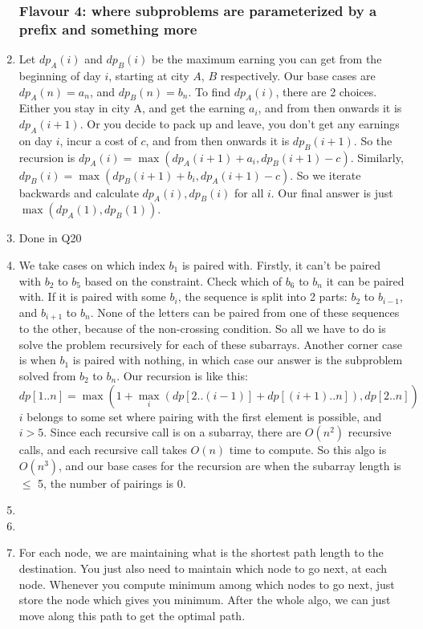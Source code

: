 \documentclass[12pt]{report}
\begin{document}
\begin{enumerate}[label=\textbf{\arabic*.}]
  \subsubsection*{Flavour 4: where subproblems are parameterized by a preﬁx and something more}

  \item Let $dp_A(i)$ and $dp_B(i)$ be the maximum earning you can get from the beginning of day $i$, starting at city $A$, $B$ respectively. Our base cases are $dp_A(n) = a_n$, and $dp_B(n) = b_n$. To find $dp_A(i)$,
  there are 2 choices. Either you stay in city A, and get the earning $a_i$, and from then onwards it is $dp_A(i+1)$. Or you decide to pack up and leave, you don't get any earnings on day $i$, incur a cost of $c$, and
  from then onwards it is $dp_B(i+1)$. So the recursion is $dp_A(i) = \max(dp_A(i+1) + a_i, dp_B(i+1) - c)$. Similarly, $dp_B(i) = \max(dp_B(i+1) + b_i, dp_A(i+1) - c)$. So we iterate backwards and calculate $dp_A(i),
  dp_B(i)$ for all $i$. Our final answer is just $\max(dp_A(1), dp_B(1))$.

  \item Done in Q20
  
  \item We take cases on which index $b_1$ is paired with. Firstly, it can't be paired with $b_2$ to $b_5$ based on the constraint. Check which of $b_6$ to $b_n$ it can be paired with. If it is paired with some $b_i$, the 
  sequence is split into 2 parts: $b_2$ to $b_{i-1}$, and $b_{i+1}$ to $b_n$. None of the letters can be paired from one of these sequences to the other, because of the non-crossing condition. So all we have to do is solve
  the problem recursively for each of these subarrays. Another corner case is when $b_1$ is paired with nothing, in which case our answer is the subproblem solved from $b_2$ to $b_n$. Our recursion is like this:
  \[dp[1 .. n] = \max(1 + \max_i (dp[2 .. (i-1)] + dp[(i+1) .. n]), dp[2 .. n]) \]
  $i$ belongs to some set where pairing with the first element is possible, and $i > 5$. Since each recursive call is on a subarray, there are $O(n^2)$ recursive calls, and each recursive call takes $O(n)$ time to compute.
  So this algo is $O(n^3)$, and our base cases for the recursion are when the subarray length is $\leq$ 5, the number of pairings is 0.

  \item
 
  \item
  
  \item For each node, we are maintaining what is the shortest path length to the destination. You just also need to maintain which node to go next, at each node. Whenever you compute minimum among which nodes to go next,
  just store the node which gives you minimum. After the whole algo, we can just move along this path to get the optimal path.


\end{enumerate}
\end{document}
